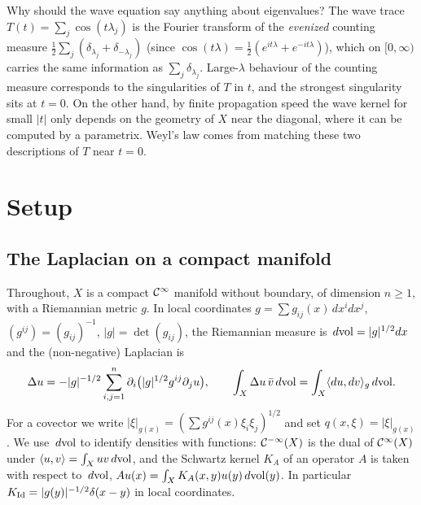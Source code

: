 \begin{discussion}
Why should the wave equation say anything about eigenvalues? The wave trace
$T(t)=\sum_j\cos(t\lambda_j)$ is the Fourier transform of the \emph{evenized}
counting measure $\frac12\sum_j(\delta_{\lambda_j}+\delta_{-\lambda_j})$ (since
$\cos(t\lambda)=\frac12(e^{it\lambda}+e^{-it\lambda})$), which on $[0,\infty)$ carries the
same information as $\sum_j\delta_{\lambda_j}$. Large-$\lambda$ behaviour of the counting
measure corresponds to the singularities of $T$ in $t$, and the strongest
singularity sits at $t=0$. On the other hand, by finite propagation speed the wave
kernel for small $|t|$ only depends on the geometry of $X$ near the diagonal, where
it can be computed by a parametrix. Weyl's law comes from matching these two
descriptions of $T$ near $t=0$.
\end{discussion}

\section{Setup}\label{wave:sec:setup}

\subsection{The Laplacian on a compact manifold}

Throughout, $X$ is a compact $\mathcal{C}^\infty$ manifold without boundary, of dimension
$n\ge1$, with a Riemannian metric $g$. In local coordinates
$g=\sum g_{ij}(x)\,dx^idx^j$, $(g^{ij})=(g_{ij})^{-1}$, $|g|=\det(g_{ij})$, the
Riemannian measure is $\,d\mathrm{vol}=|g|^{1/2}dx$ and the (non-negative) Laplacian is
\begin{equation*}
\Delta u=-|g|^{-1/2}\sum_{i,j=1}^n\partial_i\big(|g|^{1/2}g^{ij}\partial_ju\big),\qquad
\int_X\Delta u\,\bar v\,d\mathrm{vol}=\int_X\langle du,dv\rangle_g\,d\mathrm{vol} .
\end{equation*}
For a covector we write $|\xi|_{g(x)}=(\sum g^{ij}(x)\xi_i\xi_j)^{1/2}$ and set
$q(x,\xi)=|\xi|_{g(x)}$. We use $\,d\mathrm{vol}$ to identify densities with functions:
$\mathcal{C}^{-\infty}(X)$ is the dual of $\mathcal{C}^\infty(X)$ under $\langle u, v\rangle=\int_Xuv\,d\mathrm{vol}$, and the
Schwartz kernel $K_A$ of an operator $A$ is taken with respect to $\,d\mathrm{vol}$,
$Au(x)=\int_XK_A(x,y)u(y)\,d\mathrm{vol}(y)$. In particular $K_{\operatorname{Id}}=|g(y)|^{-1/2}\delta(x-y)$
in local coordinates.

